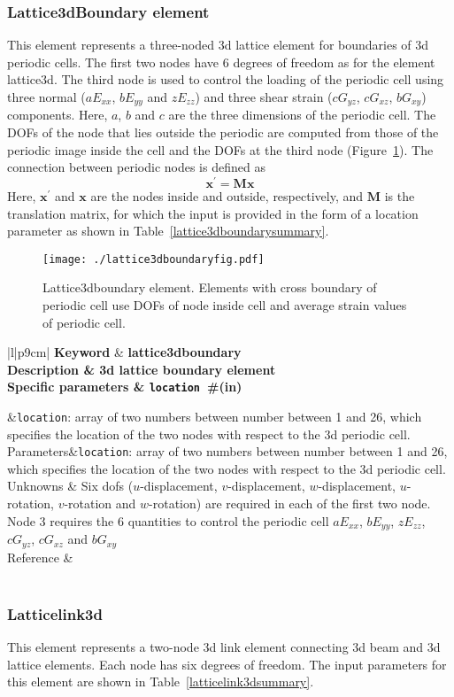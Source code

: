 \documentclass[a4paper]{article}
\newcommand{\param}[1]{\texttt{#1}} %
\newcommand{\field}[2]{\param{#1}~\#{\tiny(#2)}} %
\newcommand{\templabel}{}%
\newcommand{\tempcaption}{}%
\newcounter{nelpar}
\newenvironment{elementsummary}[5]{%
  \gdef\tempcaption{#4}%
  \gdef\templabel{#5}%
  \setcounter{nelpar}{0}%
  \begin{center} %
    \begin{table}[!htb] %
      \begin{tabular}{|l|p{9cm}|}\hline %
        {\bf Keyword} & \bf{#1}\\ %
        {Description} & {#2}\\ %
        {Specific parameters} & {#3}\\ \hline %
}{
  \\ \hline %
      \end{tabular}%
      \caption{\tempcaption}%
      \label{\templabel}%
    \end{table}%
  \end{center}%
}
\newcommand{\elementParam}[1]{%
  \ifthenelse{\value{nelpar}>0} %
             {&{#1}}%
             {\setcounter{nelpar}{1}Parameters&{#1}}%
             \\%
}
\newcommand{\elementDescription}[2]{{#1} & {#2}\\ }
\begin{document}
\subsubsection{Lattice3dBoundary element}
This element represents a three-noded 3d lattice element for boundaries of 3d periodic cells. The first two nodes have 6 degrees of freedom as for the element lattice3d. The third node is used to control the loading of the periodic cell using three normal ($aE_{xx}$, $bE_{yy}$ and $zE_{zz}$) and three shear strain ($cG_{yz}$, $cG_{xz}$, $bG_{xy}$) components. Here, $a$, $b$ and $c$ are the three dimensions of the periodic cell. The DOFs of the node that lies outside the periodic are computed from those of the periodic image inside the cell and the DOFs at the third node (Figure~\ref{lattice3dboundaryfig}). The connection between periodic nodes is defined as
\begin{equation}
  \mathbf{x}^{'} = \mathbf{M} \mathbf{x}
\end{equation}
Here, $\mathbf{x}^{'}$ and $\mathbf{x}$ are the nodes inside and outside, respectively, and $\mathbf{M}$ is the translation matrix, for which the input is provided in the form of a location parameter as shown in Table~\ref{lattice3dboundarysummary}. 

\begin{figure}[htb]
  \centering
  \texttt{[image: ./lattice3dboundaryfig.pdf]}
 \caption{Lattice3dboundary element. Elements with cross boundary of periodic cell use DOFs of node inside cell and average strain values of periodic cell.}
 \label{lattice3dboundaryfig}
\end{figure}

\begin{elementsummary}{lattice3dboundary}{3d lattice boundary element}{\field{location}{in}}{lattice3dboundary element summary}{lattice3dboundarysummary}
\elementParam{\param{location}: array of two numbers between number between 1 and 26, which specifies the location of the two nodes with respect to the 3d periodic cell.}
\elementDescription{Unknowns}{Six dofs ($u$-displacement, $v$-displacement, $w$-displacement, $u$-rotation, $v$-rotation and $w$-rotation) are required in each of the first two node. Node 3 requires the 6 quantities to control the periodic cell $aE_{xx}$, $bE_{yy}$, $zE_{zz}$, $cG_{yz}$, $cG_{xz}$ and $bG_{xy}$ }
\elementDescription{Reference}{\cite{AthWheGra18}}
\end{elementsummary}

\subsubsection{Latticelink3d}
This element represents a two-node 3d link element connecting 3d beam and 3d lattice elements. Each node has six degrees of freedom. 
The input parameters for this element are shown in Table~\ref{latticelink3dsummary}. 
\end{document}
